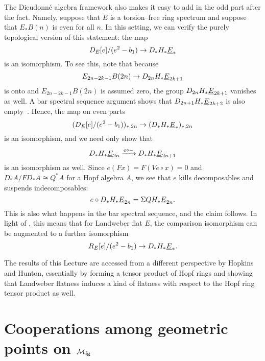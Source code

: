 \begin{remark}
The Dieudonn\'e algebra framework also makes it easy to add in the odd part after the fact.  Namely, suppose that $E$ is a torsion--free ring spectrum and suppose that $E_* B(n)$ is even for all $n$.  In this setting, we can verify the purely topological version of this statement: the map \[D_E[e] / (e^2 - b_1) \to D_* H_* \underline{\smash{E}}_{*}\] is an isomorphism.  To see this, note that because \[E_{2n-2k-1} B(2n) \to D_{2n} H_* \underline{\smash{E}}_{2k+1}\] is onto and $E_{2n-2k-1} B(2n)$ is assumed zero, the group $D_{2n} H_* \underline{\smash{E}}_{2k+1}$ vanishes as well.  A bar spectral sequence argument shows that $D_{2n+1} H_* \underline{\smash{E}}_{2k+2}$ is also empty~\cite[Lemma 11.5.1]{GoerssDieudonne}.  Hence, the map on even parts \[(D_E[e] / (e^2 - b_1))_{*, 2n} \to (D_* H_* \underline{\smash{E}}_{*})_{*, 2n}\] is an isomorphism, and we need only show that \[D_* H_* \underline{\smash{E}}_{2n} \xrightarrow{e \circ -} D_* H_* \underline{\smash{E}}_{2n+1}\] is an isomorphism as well.  Since $e(Fx) = F(Ve \circ x) = 0$ and $D_* A / FD_* A \cong Q^* A$ for a Hopf algebra $A$, we see that $e$ kills decomposables and suspends indecomposables: \[e \circ D_* H_* \underline{\smash{E}}_{2n} = \Sigma QH_* \underline{\smash{E}}_{2n}.\]  This is also what happens in the bar spectral sequence, and the claim follows.  In light of , this means that for Landweber flat $E$, the comparison isomorphism can be augmented to a further isomorphism \[R_E[e] / (e^2 - b_1) \to D_* H_* \underline{\smash{E}}_{*}.\]
\end{remark}

\begin{remark}
The results of this Lecture are accessed from a different perspective by Hopkins and Hunton, essentially by forming a tensor product of Hopf rings and showing that Landweber flatness induces a kind of flatness with respect to the Hopf ring tensor product as well.
\end{remark}














\section{Cooperations among geometric points on \texorpdfstring{$\mathcal{M}_{\mathbf{fg}}$}{Mfg}}\label{CoopnsForMoravaKandHA}

